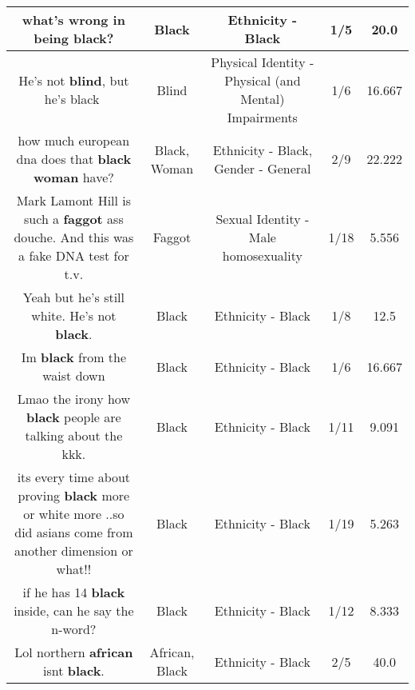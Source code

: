 \documentclass[11pt]{article}
\newlength\mylength
\begin{document}
\begin{center}
\begin{longtable}{|C{.65\mylength}|C{.30\mylength}|C{.12\mylength}|C{.12\mylength}|C{.12\mylength}|}
  \small what's wrong in being \textbf{black}?\normalsize   & Black & Ethnicity - Black & 1/5 & 20.0 \\  \hline
  \small He's not \textbf{blind}, but he's black🤣\normalsize   & Blind & Physical Identity - Physical (and Mental) Impairments & 1/6 & 16.667 \\  \hline
  \small how much european dna does that \textbf{black} \textbf{woman} have?\normalsize   & Black, Woman & Ethnicity - Black, Gender - General & 2/9 & 22.222 \\  \hline
  \small Mark Lamont Hill is such a \textbf{faggot} ass douche. And this was a fake DNA test for t.v.\normalsize   & Faggot & Sexual Identity - Male homosexuality & 1/18 & 5.556 \\  \hline
  \small Yeah but he's still white. He's not \textbf{black}.\normalsize   & Black & Ethnicity - Black & 1/8 & 12.5 \\  \hline
  \small Im \textbf{black} from the waist down\normalsize   & Black & Ethnicity - Black & 1/6 & 16.667 \\  \hline
  \small Lmao the irony how \textbf{black} people are talking about the kkk.\normalsize   & Black & Ethnicity - Black & 1/11 & 9.091 \\  \hline
  \small its every time about proving \textbf{black} more or white more ..so did asians come from another dimension or what!!\normalsize   & Black & Ethnicity - Black & 1/19 & 5.263 \\  \hline
  \small if he has 14  \textbf{black} inside, can he say the n-word?\normalsize   & Black & Ethnicity - Black & 1/12 & 8.333 \\  \hline
  \small Lol northern \textbf{african} isnt \textbf{black}.\normalsize   & African, Black & Ethnicity - Black & 2/5 & 40.0 \\  \hline

\end{longtable}
\end{center}
\end{document}
